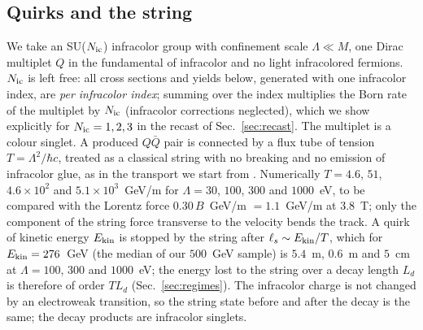 \documentclass[prd,twocolumn,nofootinbib,superscriptaddress,amsmath,amssymb]{revtex4-2}
\begin{document}
\subsection{Quirks and the string}
We take an SU($N_{\rm ic}$) infracolor group with confinement scale $\Lambda\ll M$, one Dirac multiplet $Q$ in the fundamental of infracolor and no light infracolored fermions. $N_{\rm ic}$ is left free: all cross sections and yields below, generated with one infracolor index, are \emph{per infracolor index}; summing over the index multiplies the Born rate of the multiplet by $N_{\rm ic}$ (infracolor corrections neglected), which we show explicitly for $N_{\rm ic}=1,2,3$ in the recast of Sec.~\ref{sec:recast}. The multiplet is a colour singlet. A produced $Q\bar Q$ pair is connected by a flux tube of tension $T=\Lambda^2/\hbar c$, treated as a classical string with no breaking and no emission of infracolor glue, as in the transport we start from \cite{QuirkPheno,Vami:2026}. Numerically $T=4.6$, $51$, $4.6\times10^2$ and $5.1\times10^3$~GeV/m for $\Lambda=30$, $100$, $300$ and $1000$~eV, to be compared with the Lorentz force $0.30\,B$~GeV/m $=1.1$~GeV/m at $3.8$~T; only the component of the string force transverse to the velocity bends the track. A quirk of kinetic energy $E_{\rm kin}$ is stopped by the string after $\ell_s\sim E_{\rm kin}/T$, which for $E_{\rm kin}=276$~GeV (the median of our $500$~GeV sample) is $5.4$~m, $0.6$~m and $5$~cm at $\Lambda=100$, $300$ and $1000$~eV; the energy lost to the string over a decay length $L_d$ is therefore of order $T L_d$ (Sec.~\ref{sec:regimes}). The infracolor charge is not changed by an electroweak transition, so the string state before and after the decay is the same; the decay products are infracolor singlets.
\end{document}
